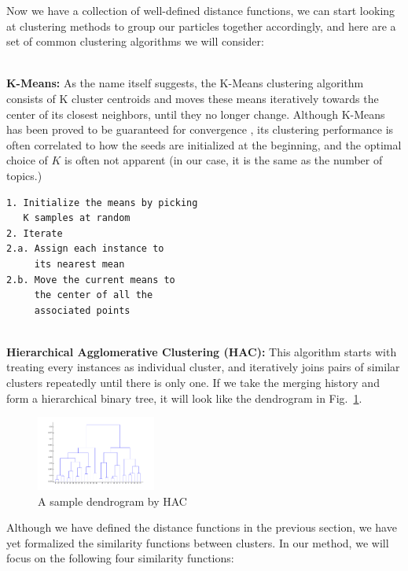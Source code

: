 \documentclass[conference]{IEEEtran}
\begin{document}
Now we have a collection of well-defined distance functions, we can start looking at clustering methods to group our particles together accordingly, and here are a set of common clustering algorithms we will consider:

\-\\
\textbf{K-Means:} As the name itself suggests, the K-Means clustering algorithm consists of K cluster centroids and moves these means iteratively towards the center of its closest neighbors, until they no longer change. Although K-Means has been proved to be guaranteed for convergence \cite{selim1984}, its clustering performance is often correlated to how the seeds are initialized at the beginning, and the optimal choice of $K$ is often not apparent (in our case, it is the same as the number of topics.)

\begin{verbatim}
1. Initialize the means by picking 
   K samples at random
2. Iterate
2.a. Assign each instance to 
     its nearest mean
2.b. Move the current means to 
	 the center of all the 
	 associated points
\end{verbatim}
\-\\
\textbf{Hierarchical Agglomerative Clustering (HAC):} This algorithm starts with treating every instances as individual cluster, and iteratively joins pairs of similar clusters repeatedly until there is only one. If we take the merging history and form a hierarchical binary tree, it will look like the dendrogram in Fig.~\ref{dendrogram}.

\begin{figure}[h]
	\center	
	\includegraphics[width=0.35\textwidth]{fig/dendrogram.png}
	\caption{A sample dendrogram by HAC}
	\label{dendrogram}
\end{figure}

Although we have defined the distance functions in the previous section, we have yet formalized the similarity functions between clusters. In our method, we will focus on the following four similarity functions:
\end{document}
